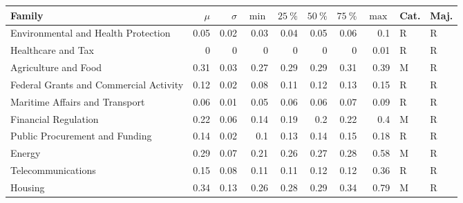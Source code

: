 \begin{tabular}{lrrrrrrrll}
\toprule
 Family                                 &   $\mu$ &   $\sigma$ &   $\min$ &   $25~\%$ &   $50~\%$ &   $75~\%$ &   $\max$ & Cat.   & Maj.   \\
\midrule
 Environmental and Health Protection    &    0.05 &       0.02 &     0.03 &      0.04 &      0.05 &      0.06 &     0.1  & R      & R      \\
 Healthcare and Tax                     &    0    &       0    &     0    &      0    &      0    &      0    &     0.01 & R      & R      \\
 Agriculture and Food                   &    0.31 &       0.03 &     0.27 &      0.29 &      0.29 &      0.31 &     0.39 & M      & R      \\
 Federal Grants and Commercial Activity &    0.12 &       0.02 &     0.08 &      0.11 &      0.12 &      0.13 &     0.15 & R      & R      \\
 Maritime Affairs and Transport         &    0.06 &       0.01 &     0.05 &      0.06 &      0.06 &      0.07 &     0.09 & R      & R      \\
 Financial Regulation                   &    0.22 &       0.06 &     0.14 &      0.19 &      0.2  &      0.22 &     0.4  & M      & R      \\
 Public Procurement and Funding         &    0.14 &       0.02 &     0.1  &      0.13 &      0.14 &      0.15 &     0.18 & R      & R      \\
 Energy                                 &    0.29 &       0.07 &     0.21 &      0.26 &      0.27 &      0.28 &     0.58 & M      & R      \\
 Telecommunications                     &    0.15 &       0.08 &     0.11 &      0.11 &      0.12 &      0.12 &     0.36 & R      & R      \\
 Housing                                &    0.34 &       0.13 &     0.26 &      0.28 &      0.29 &      0.34 &     0.79 & M      & R      \\
\bottomrule
\end{tabular}